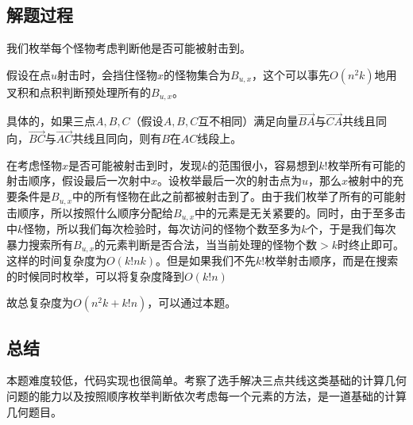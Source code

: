 \documentclass[12pt]{article}
\begin{document}
\subsection{解题过程}
我们枚举每个怪物考虑判断他是否可能被射击到。

假设在点$u$射击时，会挡住怪物$x$的怪物集合为$B_{u,x}$，这个可以事先$O(n^2k)$地用叉积和点积判断预处理所有的$B_{u,x}$。

具体的，如果三点$A,B,C$（假设$A,B,C$互不相同）满足向量$\vec{BA}$与$\vec{CA}$共线且同向，$\vec{BC}$与$\vec{AC}$共线且同向，则有$B$在$AC$线段上。

在考虑怪物$x$是否可能被射击到时，发现$k$的范围很小，容易想到$k!$枚举所有可能的射击顺序，假设最后一次射中$x$。设枚举最后一次的射击点为$u$，那么$x$被射中的充要条件是$B_{u, x}$中的所有怪物在此之前都被射击到了。由于我们枚举了所有的可能射击顺序，所以按照什么顺序分配给$B_{u,x}$中的元素是无关紧要的。同时，由于至多击中$k$怪物，所以我们每次检验时，每次访问的怪物个数至多为$k$个，于是我们每次暴力搜索所有$B_{u,x}$的元素判断是否合法，当当前处理的怪物个数$>k$时终止即可。这样的时间复杂度为$O(k!nk)$。但是如果我们不先$k!$枚举射击顺序，而是在搜索的时候同时枚举，可以将复杂度降到$O(k!n)$

故总复杂度为$O(n^2k+k!n)$，可以通过本题。

\subsection{总结}
本题难度较低，代码实现也很简单。考察了选手解决三点共线这类基础的计算几何问题的能力以及按照顺序枚举判断依次考虑每一个元素的方法，是一道基础的计算几何题目。
\end{document}
